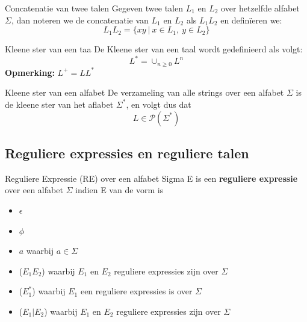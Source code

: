 \begin{pro}{Concatenatie van twee talen}
    Gegeven twee talen $L_1$ en $L_2$ over hetzelfde alfabet $\Sigma$, dan noteren we de concatenatie van
    $L_1$ en $L_2$ als $L_1L_2$ en definïeren we:
    \begin{equation*}
        L_{1}L_{2} = \{ xy  \ | \ x \in L_1,  \ y \in L_2\}
    \end{equation*}
    \vspace{-0.5cm}
\end{pro}

\newpage

\begin{pro}{Kleene ster van een taa}
    De Kleene ster van een taal wordt gedefinieerd als volgt:
    \begin{equation*}
        L^* = \cup_{n \geq 0}L^n
    \end{equation*}
    \vspace{0.3cm}
    \textbf{Opmerking:} $L^+ = LL^*$
    \vspace{-0.3cm}
\end{pro}

\begin{app}{Kleene ster van een alfabet}
    De verzameling van alle strings over een alfabet $\Sigma$ is de kleene ster van het aflabet $\Sigma^*$, en volgt dus dat
    \begin{equation*}
        L \in \mathcal{P}(\Sigma^*)
    \end{equation*}
    \vspace{-0.5cm}
\end{app}

\subsection{Reguliere expressies en reguliere talen}

\vspace{0.5cm}

\begin{theo}{Reguliere Expressie (RE) over een alfabet Sigma}
    E is een \textbf{reguliere expressie} over een alfabet $\Sigma$ indien E van de vorm is
    \begin{itemize}
        \item $\epsilon$
        \item $\phi$
        \item $a$ waarbij $a \in \Sigma$
        \item ($E_{1}E_{2}$) waarbij $E_1$ en $E_2$ reguliere expressies zijn over $\Sigma$
        \item ($E_{1}^*$) waarbij $E_1$ een reguliere expressies is over $\Sigma$
        \item ($E_{1}|E_{2}$) waarbij $E_1$ en $E_2$ reguliere expressies zijn over $\Sigma$
    \end{itemize}
    \vspace{-0.3cm}
\end{theo}

